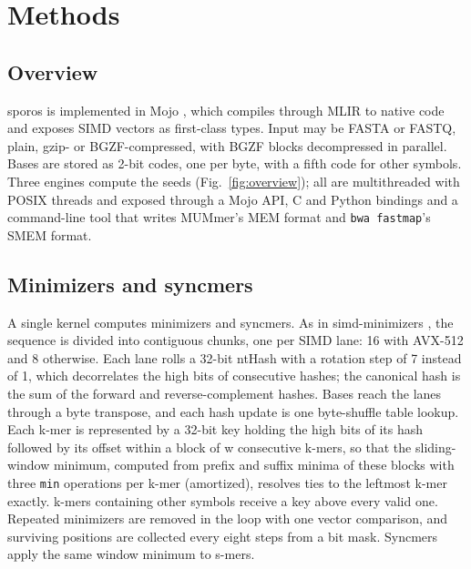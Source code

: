 \section{Methods}

\subsection{Overview}

sporos is implemented in Mojo \citep{Mojo}, which compiles through MLIR \citep{Lattner2021} to native code and exposes SIMD vectors as first-class types. Input may be FASTA or FASTQ, plain, gzip- or BGZF-compressed, with BGZF blocks decompressed in parallel. Bases are stored as 2-bit codes, one per byte, with a fifth code for other symbols. Three engines compute the seeds (Fig.~\ref{fig:overview}); all are multithreaded with POSIX threads and exposed through a Mojo API, C and Python bindings and a command-line tool that writes MUMmer's MEM format and \texttt{bwa fastmap}'s SMEM format.



\subsection{Minimizers and syncmers}

A single kernel computes minimizers and syncmers. As in simd-minimizers \citep{GrootKoerkamp2025simd}, the sequence is divided into contiguous chunks, one per SIMD lane: 16 with AVX-512 and 8 otherwise. Each lane rolls a 32-bit ntHash \citep{Mohamadi2016} with a rotation step of 7 instead of 1, which decorrelates the high bits of consecutive hashes; the canonical hash is the sum of the forward and reverse-complement hashes. Bases reach the lanes through a byte transpose, and each hash update is one byte-shuffle table lookup. Each k-mer is represented by a 32-bit key holding the high bits of its hash followed by its offset within a block of w consecutive k-mers, so that the sliding-window minimum, computed from prefix and suffix minima of these blocks with three \texttt{min} operations per k-mer (amortized), resolves ties to the leftmost k-mer exactly. k-mers containing other symbols receive a key above every valid one. Repeated minimizers are removed in the loop with one vector comparison, and surviving positions are collected every eight steps from a bit mask. Syncmers apply the same window minimum to s-mers.

